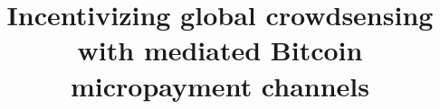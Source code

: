 \documentclass[10pt,journal,compsoc]{IEEEtran}
\begin{document}
%
\title{Incentivizing global crowdsensing with mediated Bitcoin micropayment channels}
%
%
%
%

\end{document}
